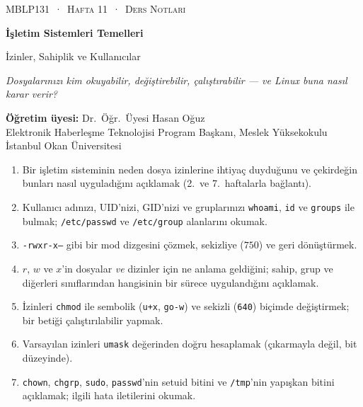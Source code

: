 \documentclass[11pt,a4paper]{article}
\newcommand{\cmd}[1]{\texttt{#1}}
\begin{document}
\setlength{\emergencystretch}{3em}
\thispagestyle{empty}
\begin{tcolorbox}[enhanced,colback=dark,colframe=dark,arc=0pt,boxrule=0pt,
  left=18pt,right=18pt,top=20pt,bottom=20pt,coltext=white]
{\small\color{mint}\textsc{MBLP131 \,·\, Hafta 11 \,·\, Ders Notları}}\par\medskip
{\headfont\fontsize{26}{30}\selectfont\bfseries İşletim Sistemleri Temelleri}\par\medskip
{\large İzinler, Sahiplik ve Kullanıcılar}\par\smallskip
{\small\itshape\color{white!70} Dosyalarınızı kim okuyabilir, değiştirebilir, çalıştırabilir --- ve Linux buna nasıl karar verir?}
\end{tcolorbox}

\vspace{0.4em}
\begin{minipage}[t]{0.70\linewidth}
\small
\textbf{Öğretim üyesi:} Dr.\ Öğr.\ Üyesi Hasan Oğuz\\
Elektronik Haberleşme Teknolojisi Program Başkanı, Meslek Yüksekokulu\\
İstanbul Okan Üniversitesi
\end{minipage}

\vspace{0.8em}
\begin{keyidea}
\begin{enumerate}[leftmargin=1.4em]
  \item Bir işletim sisteminin neden dosya izinlerine ihtiyaç duyduğunu ve çekirdeğin bunları nasıl uyguladığını açıklamak (2.\ ve 7.\ haftalarla bağlantı).
  \item Kullanıcı adınızı, UID'nizi, GID'nizi ve gruplarınızı \cmd{whoami}, \cmd{id} ve \cmd{groups} ile bulmak; \texttt{/etc/passwd} ve \texttt{/etc/group} alanlarını okumak.
  \item \texttt{-rwxr-x---} gibi bir mod dizgesini çözmek, sekizliye ($750$) ve geri dönüştürmek.
  \item $r$, $w$ ve $x$'in dosyalar \emph{ve} dizinler için ne anlama geldiğini; sahip, grup ve diğerleri sınıflarından hangisinin bir sürece uygulandığını açıklamak.
  \item İzinleri \cmd{chmod} ile sembolik (\texttt{u+x}, \texttt{go-w}) ve sekizli (\texttt{640}) biçimde değiştirmek; bir betiği çalıştırılabilir yapmak.
  \item Varsayılan izinleri \cmd{umask} değerinden doğru hesaplamak (çıkarmayla değil, bit düzeyinde).
  \item \cmd{chown}, \cmd{chgrp}, \cmd{sudo}, \cmd{passwd}'nin setuid bitini ve \texttt{/tmp}'nin yapışkan bitini açıklamak; ilgili hata iletilerini okumak.
\end{enumerate}
\end{keyidea}
\end{document}

